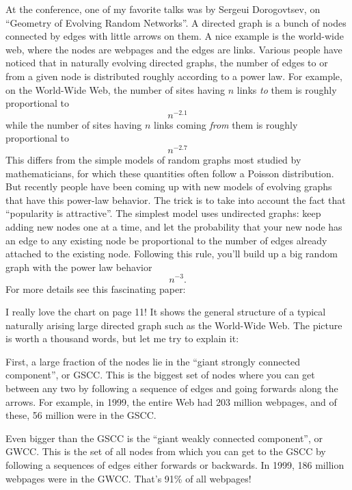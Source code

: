 \documentclass{article}
\def\tightlist{}
\renewcommand{\texttt}[1]{%
  \begingroup
  \ttfamily
  \begingroup\lccode`~=`/\lowercase{\endgroup\def~}{/\discretionary{}{}{}}%
  \begingroup\lccode`~=`[\lowercase{\endgroup\def~}{[\discretionary{}{}{}}%
  \begingroup\lccode`~=`.\lowercase{\endgroup\def~}{.\discretionary{}{}{}}%
  \catcode`/=\active\catcode`[=\active\catcode`.=\active
  \scantokens{#1\noexpand}%
  \endgroup
}
\begin{document}
At the conference, one of my favorite talks was by Sergeui Dorogovtsev,
on ``Geometry of Evolving Random Networks''. A directed graph is a bunch
of nodes connected by edges with little arrows on them. A nice example
is the world-wide web, where the nodes are webpages and the edges are
links. Various people have noticed that in naturally evolving directed
graphs, the number of edges to or from a given node is distributed
roughly according to a power law. For example, on the World-Wide Web,
the number of sites having \(n\) links \emph{to} them is roughly
proportional to \[n^{-2.1}\] while the number of sites having \(n\)
links coming \emph{from} them is roughly proportional to \[n^{-2.7}\]
This differs from the simple models of random graphs most studied by
mathematicians, for which these quantities often follow a Poisson
distribution. But recently people have been coming up with new models of
evolving graphs that have this power-law behavior. The trick is to take
into account the fact that ``popularity is attractive''. The simplest
model uses undirected graphs: keep adding new nodes one at a time, and
let the probability that your new node has an edge to any existing node
be proportional to the number of edges already attached to the existing
node. Following this rule, you'll build up a big random graph with the
power law behavior \[n^{-3}.\] For more details see this fascinating
paper:


I really love the chart on page 11! It shows the general structure of a
typical naturally arising large directed graph such as the World-Wide
Web. The picture is worth a thousand words, but let me try to explain
it:

First, a large fraction of the nodes lie in the ``giant strongly
connected component'', or GSCC. This is the biggest set of nodes where
you can get between any two by following a sequence of edges and going
forwards along the arrows. For example, in 1999, the entire Web had 203
million webpages, and of these, 56 million were in the GSCC.

Even bigger than the GSCC is the ``giant weakly connected component'',
or GWCC. This is the set of all nodes from which you can get to the GSCC
by following a sequences of edges either forwards or backwards. In 1999,
186 million webpages were in the GWCC. That's 91\% of all webpages!
\end{document}
